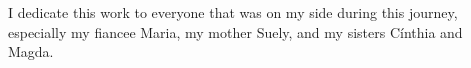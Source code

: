 I dedicate this work to everyone that was on my side during this journey, especially my fiancee Maria, my mother Suely, and my sisters Cínthia and Magda.